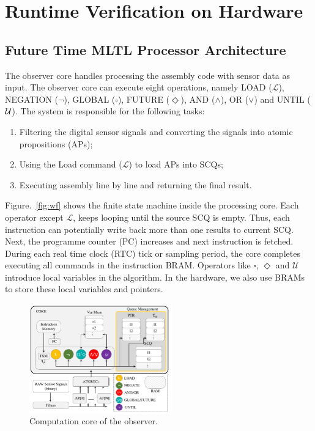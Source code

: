 \chapter{\mltl Runtime Verification on Hardware}

\section{Future Time MLTL Processor Architecture}

The \mltl observer core handles processing the assembly code with sensor data as input. The observer core can execute eight \mltl operations, namely LOAD ($\mathcal{L}$), NEGATION ($\neg$), GLOBAL ($\square$), FUTURE ($\Diamond$), AND ($\wedge$), OR ($\vee$) and UNTIL (${\mathcal{U}}$). The system is responsible for the following tasks:
\begin{enumerate}
  \item Filtering the digital sensor signals and converting the signals into atomic propositions (APs);
  \item Using the Load command ($\mathcal{L}$) to load APs into SCQs;
  \item Executing assembly line by line and returning the final result.
\end{enumerate}

Figure.~\ref{fig:wf} shows the finite state machine inside the processing core. Each operator except $\mathcal{L}$, keeps looping until the source SCQ is empty. Thus, each instruction can potentially write back more than one results to current SCQ. Next, the programme counter (PC) increases and next instruction is fetched. During each real time clock (RTC) tick or sampling period, the core completes executing all commands in the instruction BRAM. Operators like $\square$, $\Diamond$ and $\mathcal{U}$ introduce local variables in the algorithm. In the hardware, we also use BRAMs to store these local variables and pointers.\\
\begin{figure}
\centering
\includegraphics[width=0.55\textwidth]{../fig/core.pdf}
\caption{\label{fig:core}Computation core of the observer.}
\end{figure}

